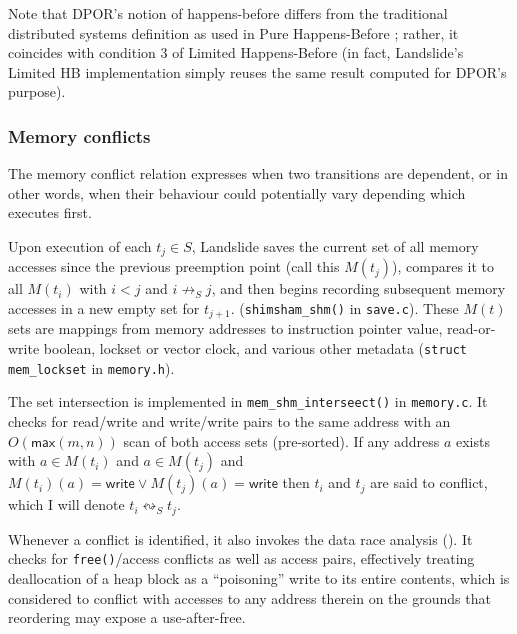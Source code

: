 Note that DPOR's notion of happens-before differs from the traditional distributed systems definition \cite{lamport-clocks}
as used in Pure Happens-Before \sect{\ref{sec:background-hb}};
rather, it coincides with condition 3 of Limited Happens-Before %
(in fact, Landslide's Limited HB implementation simply reuses the same result computed for DPOR's purpose).

\subsubsection{Memory conflicts}

The memory conflict relation expresses when two transitions are dependent,
or in other words, when their behaviour could potentially vary depending which executes first.

Upon execution of each $t_j \in S$,
Landslide saves the current set of all memory accesses since the previous preemption point (call this $M(t_j)$),
compares it to all $M(t_i)$ with $i < j$ and $i \not\rightarrow_S j$,
and then begins recording subsequent memory accesses in a new empty set for $t_{j+1}$.
({\tt shimsham\_shm()} in {\tt save.c}).
These $M(t)$ sets are mappings from memory addresses to
instruction pointer value, read-or-write boolean, lockset or vector clock, and various other metadata
({\tt struct mem\_lockset} in {\tt memory.h}).

The set intersection is implemented in {\tt mem\_shm\_interseect()} in {\tt memory.c}.
It checks for read/write and write/write pairs to the same address with an $O(\mathsf{max}(m,n))$ scan of both access sets (pre-sorted).
If any address $a$ exists with $a \in M(t_i)$ and $a \in M(t_j)$ and $M(t_i)(a) = \mathsf{write} \vee M(t_j)(a) = \mathsf{write}$
then $t_i$ and $t_j$ are said to conflict,
which I will denote $t_i \leftrightsquigarrow_S t_j$.

Whenever a conflict is identified, it also invokes the data race analysis (\sect{\ref{sec:landslide-datarace}}).
It checks for {\tt free()}/access conflicts as well as access pairs,
effectively treating deallocation of a heap block as a ``poisoning'' write to its entire contents,
which is considered to conflict with accesses to any address therein
on the grounds that reordering may expose a use-after-free.

